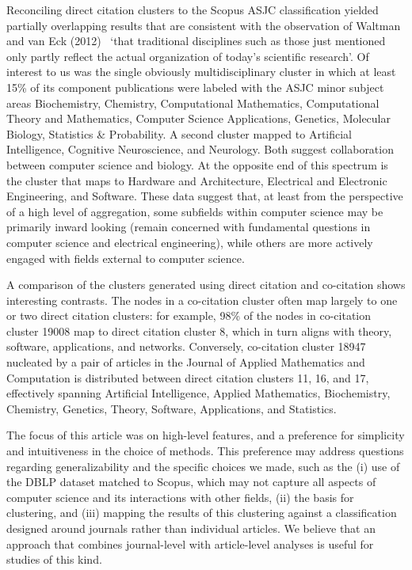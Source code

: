 Reconciling direct citation clusters to the Scopus ASJC classification yielded partially overlapping results that are consistent with the observation of Waltman and van Eck (2012)~\cite{waltman_new_2012} `that traditional disciplines such as those just mentioned only partly reflect the actual organization of today’s scientific research'. Of interest to us was the single obviously multidisciplinary cluster in which at least 15\% of its component publications were labeled with the ASJC minor subject areas Biochemistry, Chemistry, Computational Mathematics, Computational Theory and Mathematics, Computer Science Applications, Genetics, Molecular Biology, Statistics \& Probability. A second cluster mapped to Artificial Intelligence, Cognitive Neuroscience, and Neurology.  Both suggest collaboration between computer science and biology. At the opposite end of this spectrum is the cluster that maps to Hardware and Architecture, Electrical and Electronic Engineering, and Software. These data suggest that, at least from the perspective of a high level of aggregation, some subfields within computer science may be primarily inward looking (remain concerned with fundamental questions in computer science and electrical engineering), while others are more actively engaged with fields external to computer science. 

A comparison of the clusters generated using direct citation and co-citation shows interesting contrasts. The nodes in a co-citation cluster often map largely to one or two direct citation clusters: for example, 98\% of the nodes in co-citation cluster 19008 map to direct citation cluster 8, which in turn aligns with theory, software, applications, and networks. Conversely, co-citation cluster 18947 nucleated by a pair of articles in the Journal of Applied Mathematics and Computation is distributed between direct citation clusters 11, 16, and 17, effectively spanning Artificial Intelligence, Applied Mathematics, Biochemistry, Chemistry, Genetics, Theory, Software, Applications, and Statistics. 

The focus of this article was on high-level features, and a preference for simplicity and intuitiveness in the choice of methods. This preference may address questions  regarding generalizability and the specific choices we made, such as the (i) use of the DBLP dataset matched to Scopus, which may not capture all aspects of computer science and its interactions with other fields, (ii) the basis for clustering, and (iii) mapping the results of this clustering against a classification designed around journals rather than individual articles. We believe that an approach that combines journal-level  with article-level analyses is useful for studies of this kind.  

